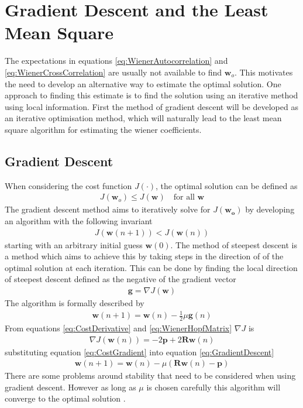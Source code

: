 \section{Gradient Descent and the Least Mean Square}
The expectations in equations \ref{eq:WienerAutocorrelation} %
and \ref{eq:WienerCrossCorrelation} are usually not %
available to find $\mathbf{w}_{o}$. This motivates the %
need to develop an alternative way to estimate the %
optimal solution. One approach to finding this estimate %
is to find the solution using an iterative method using %
local information. First the method of gradient descent will be %
developed as an iterative optimisation method, which will naturally %
lead to the least mean square algorithm for estimating the wiener %
coefficients. 
\subsection{Gradient Descent}
When considering the cost function $J(\cdot)$, %
the optimal solution can be defined as
\begin{align}
	J(\mathbf{w}_{o}) \leq J(\mathbf{w})\quad
	\text{for all }\mathbf{w}
\end{align}
The gradient descent method aims to iteratively %
solve for $J(\mathbf{w_{o}})$ by developing an %
algorithm with the following invariant
\begin{align}
	J(\mathbf{w}(n+1)) < J(\mathbf{w}(n))
\end{align}
starting with an arbitrary initial guess $\mathbf{w}(0)$. %
The method of steepest descent is a method which aims %
to achieve this by taking steps in the direction of %
of the optimal solution at each iteration. This can %
be done by finding the local direction of steepest %
descent defined as the negative of the gradient vector %
\begin{align}
	\mathbf{g} = \nabla J(\mathbf{w})
\end{align}
The algorithm is formally described by
\begin{align}
	\mathbf{w}(n+1) = \mathbf{w}(n) - \frac{1}{2}
	\mu\mathbf{g}(n)
	\label{eq:GradientDescent}
\end{align}
From equations \ref{eq:CostDerivative} and %
\ref{eq:WienerHopfMatrix} $\nabla J$ is
\begin{align}
	\nabla J(\mathbf{w}(n)) = 
	-2\mathbf{p} + 2\mathbf{R}\mathbf{w}(n)
	\label{eq:CostGradient}
\end{align}
substituting equation \ref{eq:CostGradient} into %
equation \ref{eq:GradientDescent}
\begin{align}
	\mathbf{w}(n+1) = \mathbf{w}(n) - \mu(
	\mathbf{R}\mathbf{w}(n) - \mathbf{p})
	\label{eq:WienerGradientDescent}
\end{align}
There are some problems around stability that %
need to be considered when using gradient descent. %
However as long as $\mu$ is chosen carefully this %
algorithm will converge to the optimal solution \cite{Hay02}.
